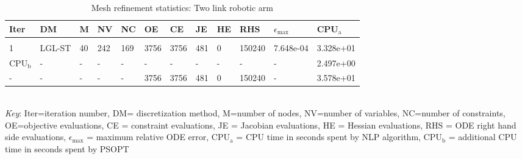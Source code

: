 
\begin{table}
\caption{Mesh refinement statistics: Two link robotic arm}
\label{mesh_stats_twolink}
\renewcommand{\tabcolsep}{0.15cm}
\tiny
\begin{tabular}{llllllllllll}
Iter&DM&M&NV&NC&OE&CE&JE&HE&RHS&$\epsilon_{\max}$&CPU$_\mathrm{a}$ \\ \hline \\
1&LGL-ST&40&242&169&3756&3756&481&0&150240&7.648e-04&3.328e+01\\
\hline
CPU$_\mathrm{b}$ &-&-&-&-&-&-&-&-&-&-&2.497e+00\\
-&-&-&-&-&3756&3756&481&0&150240&-&3.578e+01\\
\end{tabular}
\newline \\ \emph{Key}: Iter=iteration number, DM= discretization method, M=number of nodes, NV=number of variables, NC=number of constraints, OE=objective evaluations,  	              CE = constraint evaluations, JE = Jacobian evaluations, HE = Hessian evaluations, RHS = ODE right hand side 		      evaluations, $\epsilon_{\max}$ = maximum relative ODE error, CPU$_\mathrm{a}$ = CPU time in seconds spent by NLP algorithm, 		      CPU$_\mathrm{b}$ = additional CPU time in seconds spent by PSOPT
\normalsize
\end{table}